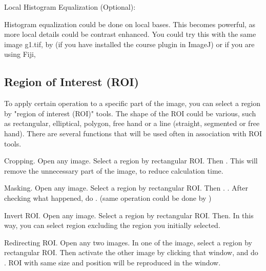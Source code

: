 \begin{indentexercise}{3}
Local Histogram Equalization (Optional):
\item Histogram equalization could be done on local bases. This becomes
powerful, as more local details could be contrast enhanced. You could
try this with the same image g1.tif, by  
(if you have installed the course plugin in ImageJ) or if you are using Fiji, 
\end{indentexercise}



\subsection{Region of Interest (ROI) }
\label{subsec:roi}
To apply certain operation to a specific part of the image, you can
select a region by "region of interest
(ROI)" tools. The shape of the ROI could be various,
such as rectangular, elliptical, polygon, free hand or a line
(straight, segmented or free hand). There are several functions that
will be used often in association with ROI tools. 

\begin{indentexercise}{1}
Cropping. Open any image. Select a region by
rectangular ROI. Then . This will
remove the unnecessary part of the image, to reduce calculation time.
\end{indentexercise}

\begin{indentexercise}{2}
Masking. Open any image. Select a region by
rectangular ROI. Then .
. After checking what
happened, do . (same operation could
be done by )
\end{indentexercise}

\begin{indentexercise}{3}
Invert ROI. Open any image. Select a region by
rectangular ROI. Then. In this way, you can select region
excluding the region you initially selected.
\end{indentexercise}

\begin{indentexercise}{4}
Redirecting ROI. Open any two images. In one
of the image, select a region by rectangular ROI. Then activate the
other image by clicking that window, and do . ROI with
same size and position will be reproduced in the window. 
\end{indentexercise}



